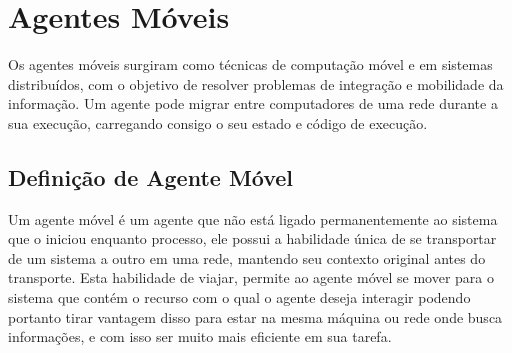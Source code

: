 \chapter{Agentes Móveis}

Os agentes móveis surgiram como técnicas de computação móvel e em sistemas distribuídos, com o objetivo de resolver problemas de integração e mobilidade da informação. Um agente pode migrar entre computadores de uma rede durante a sua execução, carregando consigo o seu estado e código de execução.

\section{Definição de Agente Móvel}
Um agente móvel é um agente que não está ligado permanentemente ao sistema que o iniciou enquanto processo, ele possui a habilidade única de se transportar de um sistema a outro em uma rede, mantendo seu contexto original antes do transporte. Esta habilidade de viajar, permite ao agente móvel se mover para o sistema que contém o recurso com o qual o agente deseja interagir podendo portanto tirar vantagem disso para estar na mesma máquina ou rede onde busca informações, e com isso ser muito mais eficiente em sua tarefa.

